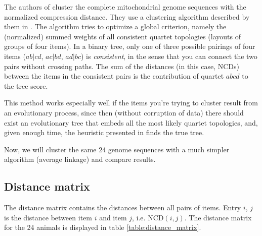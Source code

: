 The authors of \cite{Cilibrasi2005} cluster the complete mitochondrial
genome sequences with the normalized compression distance. They use
a clustering algorithm described by them in
\cite{Cilibrasi2011}. The algorithm tries to optimize a global criterion,
namely the (normalized) summed weights of all consistent quartet
topologies (layouts of groups of four items). In a binary tree, only one
of three possible pairings of four items ($ab|cd$, $ac|bd$, $ad|bc$) is
\emph{consistent}, in the sense that you can connect the two pairs without
crossing paths. The sum of the distances (in this case, $\text{NCD}$s)
between the items in the consistent pairs is the contribution of quartet
$abcd$ to the tree score.

This method works especially well if the items you're trying to cluster
result from an evolutionary process, since then (without corruption of
data) there should exist an evolutionary tree that embeds all the most
likely quartet topologies, and, given enough time, the heuristic presented
in \cite{Cilibrasi2011} finds the true tree.

Now, we will cluster the same 24 genome sequences with a much simpler
algorithm (average linkage) and compare results.

\subsection{Distance matrix}

The distance matrix contains the distances between all pairs of items.
Entry $i$, $j$ is the distance between item $i$ and item $j$, i.e.
$\text{NCD}(i, j)$. The distance matrix for the 24 animals is displayed in
table \ref{table:distance_matrix}.


